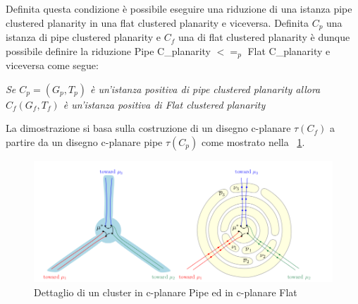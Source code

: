 {\begin{center}
\end{center}
Definita questa condizione è possibile eseguire una riduzione di una istanza pipe clustered planarity in una flat clustered planarity e viceversa.
\newpage
Definita $C_p$ una istanza di pipe clustered planarity e $C_f$ una di flat clustered planarity è dunque possibile definire la riduzione Pipe C\_planarity $<=_p$ Flat C\_planarity e viceversa come segue:
\begin{center}
	\textit{Se $C_p= (G_p, T_p)$ è un'istanza positiva di pipe clustered planarity allora $C_f (G_f, T_f)$ è un'istanza positiva di Flat clustered planarity}
\end{center}
La dimostrazione si basa sulla costruzione di un disegno c-planare $\tau(C_f)$ a partire da un disegno c-planare pipe $\tau(C_p)$ come mostrato nella \figurename~\ref{fig:flatVsPipe}.
\begin{figure}[!htb]
	\begin{center}
		\includegraphics[width=1 \linewidth]{figure/flatVsPipe}
	\end{center}
	\caption{Dettaglio di un cluster in c-planare Pipe ed in c-planare Flat \label{fig:flatVsPipe}}
\end{figure}

}
